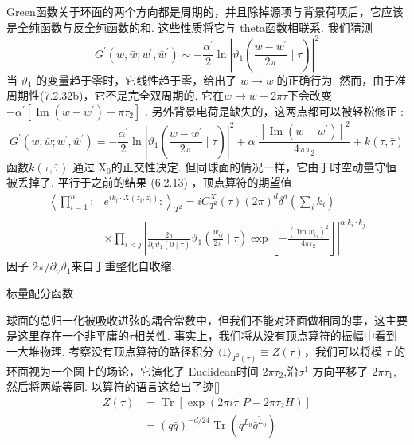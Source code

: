 Green函数关于环面的两个方向都是周期的，并且除掉源项与背景荷项后，它应该是全纯函数与反全纯函数的和. 这些性质将它与 theta函数相联系. 我们猜测 
\begin{equation}
	G^{\prime}\left(w, \bar{w} ; w^{\prime}, \bar{w}^{\prime}\right) \sim-\frac{\alpha^{\prime}}{2} \ln \left|\vartheta_{1}\left(\frac{w-w^{\prime}}{2 \pi} \mid \tau\right)\right|^{2}
\end{equation}
当 $\vartheta_{1}$ 的变量趋于零时，它线性趋于零，给出了 $w \rightarrow w^{\prime} $的正确行为.  然而，由于准周期性(7.2.32b)，它不是完全双周期的. 它在$w \rightarrow w+2 \pi \tau$下会改变 $-\alpha^{\prime}\left[\operatorname{Im}\left(w-w^{\prime}\right)+\pi \tau_{2}\right]$ . 另外背景电荷是缺失的，这两点都可以被轻松修正 :
\begin{equation}
	G^{\prime}\left(w, \bar{w} ; w^{\prime}, \bar{w}^{\prime}\right)=-\frac{\alpha^{\prime}}{2} \ln \left|\vartheta_{1}\left(\frac{w-w^{\prime}}{2 \pi} \mid \tau\right)\right|^{2}+\alpha^{\prime} \frac{\left[\operatorname{Im}\left(w-w^{\prime}\right)\right]^{2}}{4 \pi \tau_{2}}+k(\tau, \bar{\tau})
\end{equation}
函数$k(\tau, \bar{\tau})$ 通过 $\mathrm{X}_{0}$的正交性决定. 但同球面的情况一样，它由于时空动量守恒被丢掉了. 平行于之前的结果 (6.2.13) ，顶点算符的期望值
\begin{equation}
	\begin{aligned}
		\left\langle\prod_{i=1}^{n}:\right.&\left.e^{i k_{i} \cdot X\left(z_{i}, \bar{z}_{i}\right)}:\right\rangle_{T^{2}}=i C_{T^{2}}^{X}(\tau)(2 \pi)^{d} \delta^{d}\left(\sum_{i} k_{i}\right) \\
		& \times \prod_{i<j}\left|\frac{2 \pi}{\partial_{v} \vartheta_{1}(0 \mid \tau)} \vartheta_{1}\left(\frac{w_{i j}}{2 \pi} \mid \tau\right) \exp \left[-\frac{\left(\operatorname{Im} w_{i j}\right)^{2}}{4 \pi \tau_{2}}\right]\right|^{\alpha^{\prime} k_{i} \cdot k_{j}}
	\end{aligned}
\end{equation}
因子 $2 \pi / \partial_{v} \vartheta_{1}$来自于重整化自收缩.\\

\centerline{\Large 标量配分函数}
球面的总归一化被吸收进弦的耦合常数中，但我们不能对环面做相同的事，这主要是这里存在一个非平庸的$\tau$相关性. 事实上，我们将从没有顶点算符的振幅中看到一大堆物理. 考察没有顶点算符的路径积分 $\langle 1\rangle_{T^{2}(\tau)} \equiv Z(\tau) $，我们可以将模 $\tau$ 的环面视为一个圆上的场论，它演化了 Euclidean时间 $2 \pi \tau_{2}$,沿$\sigma^{1}$ 方向平移了 $2 \pi \tau_{1}$, 然后将两端等同. 以算符的语言这给出了迹[]
\begin{equation}
	\begin{aligned}
		Z(\tau) &=\operatorname{Tr}\left[\exp \left(2 \pi i \tau_{1} P-2 \pi \tau_{2} H\right)\right] \\
		&=(q \bar{q})^{-d / 24} \operatorname{Tr}\left(q^{L_{0}} \bar{q}^{\tilde{L}_{0}}\right)
	\end{aligned}
\end{equation}

